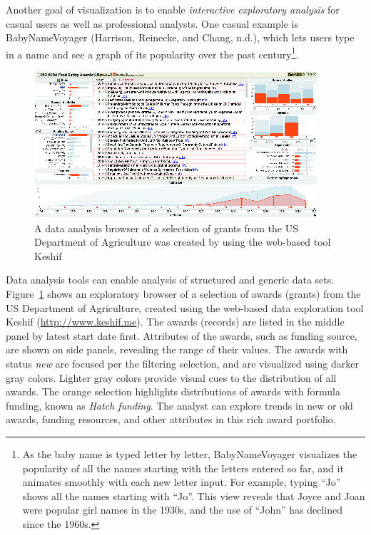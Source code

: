 \documentclass[]{krantz}
\begin{document}
Another goal of visualization is to enable \emph{interactive exploratory
analysis} for casual users as well as professional analysts. One casual
example is BabyNameVoyager (Harrison, Reinecke, and Chang, n.d.), which
lets users type in a name and see a graph of its popularity over the
past century\footnote{As the baby name is typed letter by letter,
  BabyNameVoyager visualizes the popularity of all the names starting
  with the letters entered so far, and it animates smoothly with each
  new letter input. For example, typing ``Jo'' shows all the names
  starting with ``Jo''. This view reveals that Joyce and Joan were
  popular girl names in the 1930s, and the use of ``John'' has declined
  since the 1960s.}.

\begin{figure}

{\centering \includegraphics[width=0.7\linewidth]{ChapterViz/figures/fig9-2} 

}

\caption{A data analysis browser of a selection of grants from the US Department of Agriculture was created by using the web-based tool Keshif}\label{fig:fig9-2}
\end{figure}

\vspace*{-12pt} Data analysis tools can enable analysis of structured
and generic data sets. Figure~\ref{fig:fig9-2} shows an exploratory
browser of a selection of awards (grants) from the US Department of
Agriculture, created using the web-based data exploration tool Keshif
(\url{http://www.keshif.me}). The awards (records) are listed in the
middle panel by latest start date first. Attributes of the awards, such
as funding source, are shown on side panels, revealing the range of
their values. The awards with status \emph{new} are focused per the
filtering selection, and are visualized using darker gray colors.
Lighter gray colors provide visual cues to the distribution of all
awards. The orange selection highlights distributions of awards with
formula funding, known as \emph{Hatch funding}. The analyst can explore
trends in new or old awards, funding resources, and other attributes in
this rich award portfolio.
\end{document}
